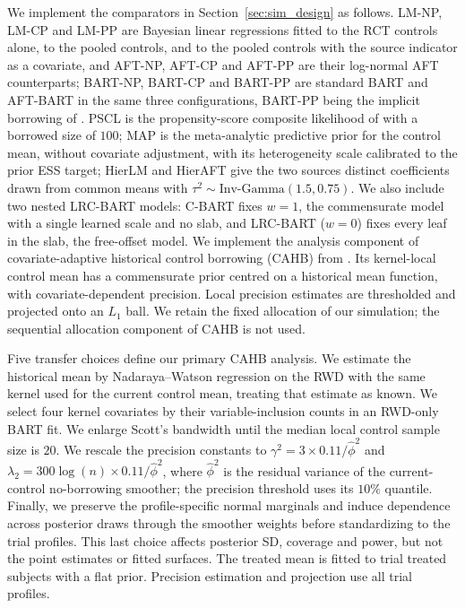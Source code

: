 \documentclass[11pt]{article}
\theoremstyle{definition}
\theoremstyle{plain}
\begin{document}
We implement the comparators in Section~\ref{sec:sim_design} as follows. LM-NP, LM-CP and LM-PP are Bayesian linear regressions fitted to the RCT controls alone, to the pooled controls, and to the pooled controls with the source indicator as a covariate, and AFT-NP, AFT-CP and AFT-PP are their log-normal AFT counterparts; BART-NP, BART-CP and BART-PP are standard BART and AFT-BART \citep{Chipman2010BART,Sparapani2021BART} in the same three configurations, BART-PP being the implicit borrowing of \citet{ZhouJi2021}. PSCL is the propensity-score composite likelihood of \citet{Chen2020PSCL} with a borrowed size of $100$; MAP is the meta-analytic predictive prior for the control mean, without covariate adjustment, with its heterogeneity scale calibrated to the prior ESS target; HierLM and HierAFT give the two sources distinct coefficients drawn from common means with $\tau^2\sim\text{Inv-Gamma}(1.5,0.75)$. We also include two nested LRC-BART models: C-BART fixes $w=1$, the commensurate model with a single learned scale and no slab, and LRC-BART ($w=0$) fixes every leaf in the slab, the free-offset model.
We implement the analysis component of covariate-adaptive historical control borrowing (CAHB) from \citet{Jin2023CAHB}. Its kernel-local control mean has a commensurate prior centred on a historical mean function, with covariate-dependent precision. Local precision estimates are thresholded and projected onto an $L_1$ ball. We retain the fixed allocation of our simulation; the sequential allocation component of CAHB is not used.

Five transfer choices define our primary CAHB analysis. We estimate the historical mean by Nadaraya--Watson regression on the RWD with the same kernel used for the current control mean, treating that estimate as known. We select four kernel covariates by their variable-inclusion counts in an RWD-only BART fit. We enlarge Scott's bandwidth until the median local control sample size is $20$. We rescale the precision constants to $\gamma^2=3\times0.11/\hat\phi^2$ and $\lambda_2=300\log(n)\times0.11/\hat\phi^2$, where $\hat\phi^2$ is the residual variance of the current-control no-borrowing smoother; the precision threshold uses its $10\%$ quantile. Finally, we preserve the profile-specific normal marginals and induce dependence across posterior draws through the smoother weights before standardizing to the trial profiles. This last choice affects posterior SD, coverage and power, but not the point estimates or fitted surfaces. The treated mean is fitted to trial treated subjects with a flat prior. Precision estimation and projection use all trial profiles.
\end{document}
